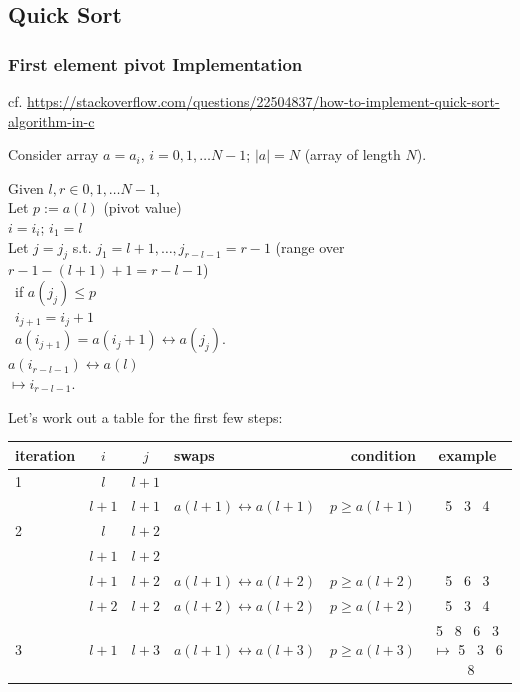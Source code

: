 \documentclass[10pt]{amsart}
\begin{document}
\subsection{Quick Sort}

\subsubsection{First element pivot Implementation}

cf. \url{https://stackoverflow.com/questions/22504837/how-to-implement-quick-sort-algorithm-in-c}

Consider array $a=a_i$, $i=0,1, \dots N-1$; $|a|=N$ (array of length $N$).

Given $l, r \in 0,1,\dots N-1$, \\
Let $p:= a(l)$ (pivot value) \\
$i=i_i$; $i_1=l$ \\
Let $j=j_j$ s.t. $j_1=l+1, \dots , j_{r-l-1} = r-1$ (range over $r-1 - (l+1)+1 = r-l-1$) \\
\qquad \, if $a(j_j) \leq p$ \\
\qquad \, \phantom{if} $i_{j+1} = i_j+1$ \\
\qquad \, \phantom{if} $a(i_{j+1}) = a(i_j+1) \leftrightarrow a(j_j)$. \\

$a(i_{r-l-1}) \leftrightarrow a(l)$ \\
$\mapsto i_{r-l-1}$.

Let's work out a table for the first few steps:
\begin{center}
	\begin{tabular}{ l | c | c | l | r | c }
		\hline
		iteration & $i$ & $j$ & swaps & condition & example \\ \hline
		1 & $l$ & $l+1$ & & & \\ \hline
		 & $l + 1$ &  $l + 1$ & $a(l + 1) \leftrightarrow a(l+1)$ & $p\geq a(l+1)$ & 5 \, 3 \, 4 \\
		 2 & $l$ & $l+2$ & & & \\
		 & $l+1$ & $l+2$ & & & \\
		 & $l + 1$ & $l+2$ & $a(l+1) \leftrightarrow a(l+2)$ & $p \geq a(l+2)$ & 5 \, 6 \, 3 \\
		 & $l + 2$ & $l+ 2$ & $a(l+2) \leftrightarrow a(l+2)$ & $p \geq a(l+2)$ & 5 \, 3 \, 4 \\
		 3 & $l+1$ & $l+3$ & $a(l+1) \leftrightarrow a(l+3)$ & $p\geq a(l+3)$ & 5 \, 8 \, 6 \, 3 $\mapsto $ 5 \, 3 \, 6 \, 8 \\
		\hline
	\end{tabular}
\end{center}
\end{document}
